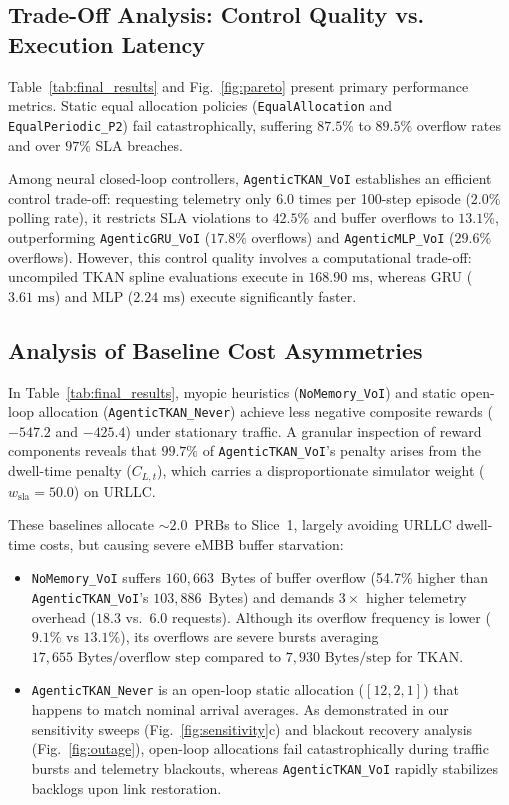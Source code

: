 \documentclass[conference]{IEEEtran}
\begin{document}
\subsection{Trade-Off Analysis: Control Quality vs. Execution Latency}
Table~\ref{tab:final_results} and Fig.~\ref{fig:pareto} present primary performance metrics. Static equal allocation policies (\texttt{EqualAllocation} and \texttt{EqualPeriodic\_P2}) fail catastrophically, suffering $87.5\%$ to $89.5\%$ overflow rates and over $97\%$ SLA breaches. 

Among neural closed-loop controllers, \texttt{AgenticTKAN\_VoI} establishes an efficient control trade-off: requesting telemetry only 6.0 times per 100-step episode ($2.0\%$ polling rate), it restricts SLA violations to $42.5\%$ and buffer overflows to $13.1\%$, outperforming \texttt{AgenticGRU\_VoI} ($17.8\%$ overflows) and \texttt{AgenticMLP\_VoI} ($29.6\%$ overflows). However, this control quality involves a computational trade-off: uncompiled TKAN spline evaluations execute in $168.90\text{ ms}$, whereas GRU ($3.61\text{ ms}$) and MLP ($2.24\text{ ms}$) execute significantly faster.

\subsection{Analysis of Baseline Cost Asymmetries}
In Table~\ref{tab:final_results}, myopic heuristics (\texttt{NoMemory\_VoI}) and static open-loop allocation (\texttt{AgenticTKAN\_Never}) achieve less negative composite rewards ($-547.2$ and $-425.4$) under stationary traffic. A granular inspection of reward components reveals that $99.7\%$ of \texttt{AgenticTKAN\_VoI}'s penalty arises from the dwell-time penalty ($C_{L, t}$), which carries a disproportionate simulator weight ($w_{\text{sla}} = 50.0$) on URLLC. 

These baselines allocate $\sim 2.0$~PRBs to Slice~1, largely avoiding URLLC dwell-time costs, but causing severe eMBB buffer starvation:
\begin{itemize}
    \item \texttt{NoMemory\_VoI} suffers $160,663$~Bytes of buffer overflow (54.7\% higher than \texttt{AgenticTKAN\_VoI}'s $103,886$~Bytes) and demands $3\times$ higher telemetry overhead ($18.3$ vs.\ $6.0$ requests). Although its overflow frequency is lower ($9.1\%$ vs $13.1\%$), its overflows are severe bursts averaging $17,655\text{ Bytes/overflow step}$ compared to $7,930\text{ Bytes/step}$ for TKAN.
    \item \texttt{AgenticTKAN\_Never} is an open-loop static allocation ($[12, 2, 1]$) that happens to match nominal arrival averages. As demonstrated in our sensitivity sweeps (Fig.~\ref{fig:sensitivity}c) and blackout recovery analysis (Fig.~\ref{fig:outage}), open-loop allocations fail catastrophically during traffic bursts and telemetry blackouts, whereas \texttt{AgenticTKAN\_VoI} rapidly stabilizes backlogs upon link restoration.
\end{itemize}
\end{document}
